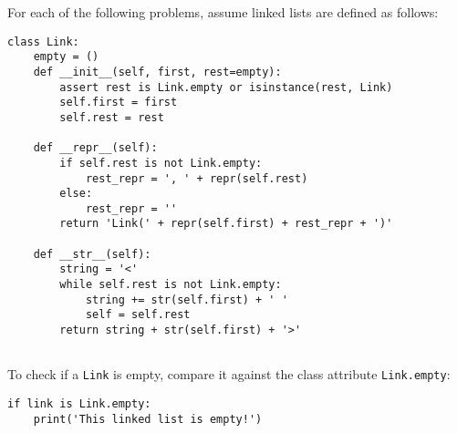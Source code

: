 \begin{blocksection}
For each of the following problems, assume linked lists are defined as follows:
\newline
\begin{lstlisting}
class Link:
    empty = ()
    def __init__(self, first, rest=empty):
        assert rest is Link.empty or isinstance(rest, Link)
        self.first = first
        self.rest = rest

    def __repr__(self):
        if self.rest is not Link.empty:
            rest_repr = ', ' + repr(self.rest)
        else:
            rest_repr = ''
        return 'Link(' + repr(self.first) + rest_repr + ')'

    def __str__(self):
        string = '<'
        while self.rest is not Link.empty:
            string += str(self.first) + ' '
            self = self.rest
        return string + str(self.first) + '>'
        
\end{lstlisting}
\vspace{\baselineskip}
To check if a \texttt{Link} is empty, compare it against the class attribute \texttt{Link.empty}:
\newline
\begin{lstlisting}
if link is Link.empty:
    print('This linked list is empty!')
\end{lstlisting}
\end{blocksection}
